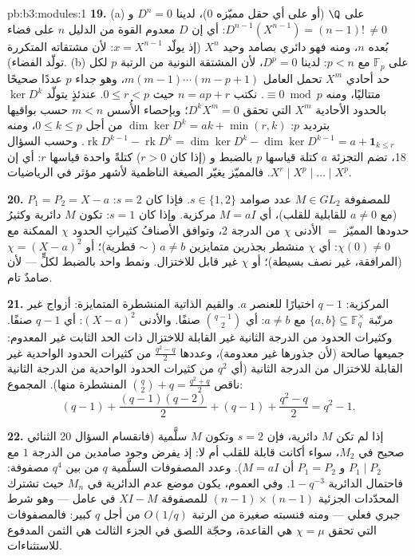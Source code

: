 \begin{solution}{pb:b3:modules:1}
\textbf{19.} (a) على $\Q$ (أو على أي حقل مميّزه $0$)، لدينا
$D^n = 0$ و $D^{n-1}(X^{n-1}) = (n-1)!\, \neq 0$: أي إن $D$ معدوم القوة من الدليل $n$ على
فضاء بُعده $n$، ومنه فهو دائري بصامد وحيد $X^n$ (إذ يولّد
$x = X^{n-1}$: لأن مشتقاته المتكررة تولّد الفضاء). (b) على
$\mathbb F_p$ مع $p
< n$: لدينا $D^p = 0$، لأن المشتقة النونية
من الرتبة $p$ لكل حد أحادي $X^m$ تحمل العامل $m(m-1)\cdots(m-p+1)$، وهو جداء
$p$ عددًا صحيحًا متتاليًا، ومنه $\equiv 0 \bmod p$. نكتب $n = ap + r$ حيث
$0 \leq r < p$. عندئذٍ يتولّد $\ker D^k$ بالحدود الأحادية $X^m$
التي تحقق $D^kX^m = 0$؛ وبإحصاء الأُسس $m < n$ حسب بواقيها
بترديد $p$: $\dim\ker D^k = ak + \min(r,
k)$ من أجل $0 \leq k \leq p$، ومنه $\operatorname{rk}D^{k-1} -
\operatorname{rk}D^k = \dim\ker D^k - \dim\ker D^{k-1} = a +
\mathbf 1_{k \leq r}$. وحسب السؤال
18، تضم التجزئة $a$ كتلة قياسها $p$ بالضبط و (إذا كان $r > 0$)
كتلةً واحدة قياسها $r$: أي إن  $X^r \mid X^p \mid \dots \mid X^p$. فالمميّز
يغيّر الصيغة الناظمية لأشهر مؤثر في الرياضيات.

\textbf{20.} للمصفوفة $M \in GL_2$ عدد صوامد $s \in \{1, 2\}$.
فإذا كان $s = 2$: $P_1 = P_2 = X - a$ (مع $a \neq 0$ للقابلية للقلب)، أي
$M = aI$ مركزية. وإذا كان $s = 1$: تكون $M$ دائرية وكثيرُ حدودها
المميّز $=$ الأدنى $\chi$ من الدرجة $2$، وتوافق الأصنافُ
كثيراتِ الحدود $\chi$ الممكنة مع $\chi(0) \neq 0$: أي $\chi$
منشطر بجذرين متمايزين $a \neq
b$ ( $\sim$ قطرية)؛
أو $\chi = (X - a)^2$ (المرافقة، غير نصف بسيطة)؛ أو $\chi$ غير قابل
للاختزال. ونمط واحد بالضبط لكلٍّ --- لأن  صامدٌ
تام.

\textbf{21.} المركزية: $q - 1$ اختيارًا للعنصر $a$. والقيم
الذاتية المنشطرة المتمايزة: أزواج غير مرتّبة $\{a, b\} \subseteq
\mathbb F_q^\times$ مع
$a \neq b$: أي $\binom{q-1}2$ صنفًا. والأدنى $(X-a)^2$: أي
$q - 1$ صنفًا. وكثيرات الحدود من الدرجة الثانية غير القابلة
للاختزال ذات الحد الثابت غير المعدوم: جميعها صالحة (لأن جذورها
غير معدومة)، وعددها $\frac{q^2 - q}2$ من كثيرات الحدود الواحدية غير
القابلة للاختزال من الدرجة الثانية (أي $q^2$ من كثيرات الحدود
الواحدية من الدرجة الثانية ناقص $\binom q2 + q = \frac{q^2+q}2$ المنشطرة منها).
المجموع:
\[
(q - 1) + \frac{(q-1)(q-2)}2 + (q - 1) + \frac{q^2 - q}2
= q^2 - 1 .
\]

\textbf{22.} إذا لم تكن $M$ دائرية، فإن $s = 2$ وتكون $M$
سلَّمية (فانقسام السؤال 20 الثنائي صحيح في $M_2$، سواء أكانت
قابلة للقلب أم لا: إذ يفرض وجود صامدين من الدرجة $1$ مع
$P_1 \mid P_2$ و $P_1 =
P_2$ أن $M = aI$). وعدد المصفوفات
السلَّمية $q$ من بين $q^4$ مصفوفة: فاحتمال الدائرية
$1 - q^{-3}$. وفي العموم، يكون موضع عدم الدائرية في $M_n$ حيث
تشترك المحدّدات الجزئية $(n-1)\times(n-1)$ للمصفوفة $XI - M$ في عامل ---
وهو شرط جبري فعلي --- ومنه فنسبته صغيرة من الرتبة $O(1/q)$ من
أجل $q$ كبير: فالمصفوفات التي تحقق $\chi = \mu$ هي القاعدة،
وحجّة اللصق في الجزء الثالث هي الثمن المدفوع للاستثناءات.


\end{solution}
